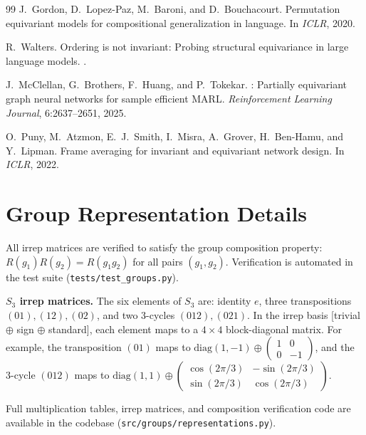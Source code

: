 \documentclass[10pt, letterpaper]{article}
\begin{document}
\begin{thebibliography}{99}
J.~Gordon, D.~Lopez-Paz, M.~Baroni, and D.~Bouchacourt.
\newblock Permutation equivariant models for compositional generalization in language.
\newblock In \emph{ICLR}, 2020.

R.~Walters.
\newblock Ordering is not invariant: Probing structural equivariance in large language models.
.

J.~McClellan, G.~Brothers, F.~Huang, and P.~Tokekar.
: Partially equivariant graph neural networks for sample efficient {MARL}.
\newblock \emph{Reinforcement Learning Journal}, 6:2637--2651, 2025.

O.~Puny, M.~Atzmon, E.~J.~Smith, I.~Misra, A.~Grover, H.~Ben-Hamu, and Y.~Lipman.
\newblock Frame averaging for invariant and equivariant network design.
\newblock In \emph{ICLR}, 2022.

\end{thebibliography}

\appendix

\section{Group Representation Details}
\label{app:groups}

All irrep matrices are verified to satisfy the group composition property: $R(g_1)R(g_2) = R(g_1 g_2)$ for all pairs $(g_1, g_2)$. Verification is automated in the test suite (\texttt{tests/test\_groups.py}).

\textbf{$S_3$ irrep matrices.} The six elements of $S_3$ are: identity $e$, three transpositions $(01), (12), (02)$, and two 3-cycles $(012), (021)$. In the irrep basis [trivial $\oplus$ sign $\oplus$ standard], each element maps to a $4 \times 4$ block-diagonal matrix. For example, the transposition $(01)$ maps to $\text{diag}(1, -1) \oplus \begin{pmatrix} 1 & 0 \\ 0 & -1 \end{pmatrix}$, and the 3-cycle $(012)$ maps to $\text{diag}(1, 1) \oplus \begin{pmatrix} \cos(2\pi/3) & -\sin(2\pi/3) \\ \sin(2\pi/3) & \cos(2\pi/3) \end{pmatrix}$.

Full multiplication tables, irrep matrices, and composition verification code are available in the codebase (\texttt{src/groups/representations.py}).
\end{document}
